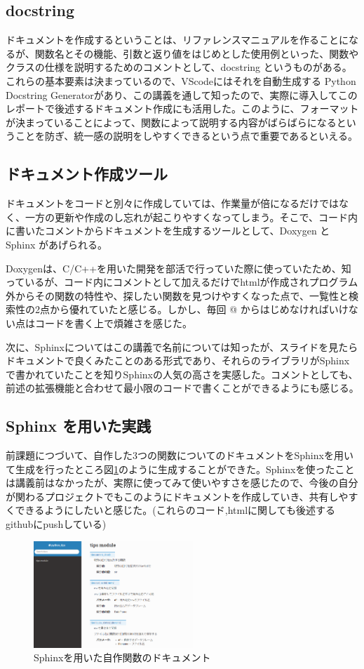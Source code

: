 \documentclass[12pt]{jsarticle}
\begin{document}
\subsection{docstring}
ドキュメントを作成するということは、リファレンスマニュアルを作ることになるが、関数名とその機能、引数と返り値をはじめとした使用例といった、関数やクラスの仕様を説明するためのコメントとして、docstring というものがある。これらの基本要素は決まっているので、VScodeにはそれを自動生成する Python Docstring Generatorがあり、この講義を通して知ったので、実際に導入してこのレポートで後述するドキュメント作成にも活用した。このように、フォーマットが決まっていることによって、関数によって説明する内容がばらばらになるということを防ぎ、統一感の説明をしやすくできるという点で重要であるといえる。

\subsection{ドキュメント作成ツール}
ドキュメントをコードと別々に作成していては、作業量が倍になるだけではなく、一方の更新や作成のし忘れが起こりやすくなってしまう。そこで、コード内に書いたコメントからドキュメントを生成するツールとして、Doxygen と Sphinx があげられる。

Doxygenは、C/C++を用いた開発を部活で行っていた際に使っていたため、知っているが、コード内にコメントとして加えるだけでhtmlが作成されプログラム外からその関数の特性や、探したい関数を見つけやすくなった点で、一覧性と検索性の2点から優れていたと感じる。しかし、毎回 @ からはじめなければいけない点はコードを書く上で煩雑さを感じた。

次に、Sphinxについてはこの講義で名前については知ったが、スライドを見たらドキュメントで良くみたことのある形式であり、それらのライブラリがSphinxで書かれていたことを知りSphinxの人気の高さを実感した。コメントとしても、前述の拡張機能と合わせて最小限のコードで書くことができるようにも感じる。

\subsection{Sphinx を用いた実践}
前課題につづいて、自作した3つの関数についてのドキュメントをSphinxを用いて生成を行ったところ図\ref{fig:sphinx}のように生成することができた。Sphinxを使ったことは講義前はなかったが、実際に使ってみて使いやすさを感じたので、今後の自分が関わるプロジェクトでもこのようにドキュメントを作成していき、共有しやすくできるようにしたいと感じた。(これらのコード,htmlに関しても後述するgithubにpushしている)

\begin{figure}[htbp]
  \includegraphics[width=6.0cm]{./sphinx.png}
  \caption{Sphinxを用いた自作関数のドキュメント}
  \label{fig:sphinx}
\end{figure}
\end{document}
